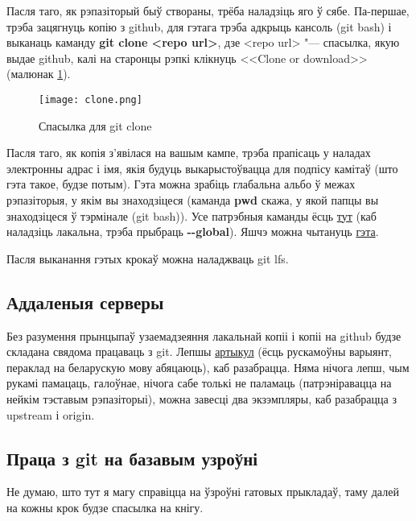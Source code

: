 Пасля таго, як рэпазіторый быў створаны, трёба наладзіць яго ў сябе. Па-першае, трэба зацягнуць копію з github, для гэтага трэба адкрыць кансоль (git bash) і выканаць каманду \textbf{git clone <repo url>}, дзе <repo url> "--- спасылка, якую выдае github, калі на старонцы рэпкі клікнуць <<Clone or download>> (малюнак \ref{clone}).

\begin{figure}[H]

\begin{center}
	\texttt{[image: clone.png]}
\end{center}

\caption{Спасылка для git clone} \label{clone}
\end{figure}

Пасля таго, як копія з'явілася на вашым кампе, трэба прапісаць у наладах электронны адрас і імя, якія будуць выкарыстоўвацца для подпісу камітаў (што гэта такое, будзе потым). Гэта можна зрабіць глабальна альбо ў межах рэпазіторыя, у якім вы знаходзіцеся (каманда \textbf{pwd} скажа, у якой папцы вы знаходзіцеся ў тэрмінале (git bash)). Усе патрэбныя каманды ёсць \href{https://git-scm.com/book/en/v2/Customizing-Git-Git-Configuration}{тут} (каб наладзіць лакальна, трэба прыбраць \textbf{-\hspace{1pt}-global}). Яшчэ можна чытануць \href{https://help.github.com/en/articles/about-commit-email-addresses}{гэта}.

Пасля выканання гэтых крокаў можна наладжваць git lfs. 

\subsection{Аддаленыя серверы}

Без разумення прынцыпаў узаемадзеяння лакальнай копіі і копіі на github будзе складана свядома працаваць з git. Лепшы \href{https://git-scm.com/book/en/v2/Git-Basics-Working-with-Remotes}{артыкул} (ёсць рускамоўны варыянт, пераклад на беларускую мову абяцаюць), каб разабрацца. Няма нічога лепш, чым рукамі памацаць, галоўнае, нічога сабе толькі не паламаць (патрэніравацца на нейкім тэставым рэпазіторыі), можна завесці два экзэмпляры, каб разабрацца з upstream і origin. 

\subsection{Праца з git на базавым узроўні}

Не думаю, што тут я магу справіцца на ўзроўні гатовых прыкладаў, таму далей на кожны крок будзе спасылка на кнігу.

